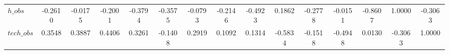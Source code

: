 \begin{center}
\begin{longtable}{lcccccccccccccc}
$h\_obs         $	 & 	          -0.2610	 & 	          -0.0175	 & 	          -0.2001	 & 	          -0.3794	 & 	          -0.3575	 & 	          -0.0793	 & 	          -0.2146	 & 	          -0.4923	 & 	           0.1862	 & 	          -0.2778	 & 	          -0.0151	 & 	          -0.8607	 & 	           1.0000	 & 	          -0.3063 \\ 
$tech\_obs      $	 & 	           0.3548	 & 	           0.3887	 & 	           0.4406	 & 	           0.3261	 & 	          -0.1408	 & 	           0.2919	 & 	           0.1092	 & 	           0.1314	 & 	          -0.5834	 & 	          -0.1518	 & 	          -0.4948	 & 	           0.0130	 & 	          -0.3063	 & 	           1.0000 \\ 
\end{longtable}
 \end{center}
